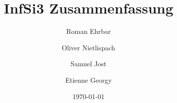 \documentclass[10pt,a4paper]{article}
\title{InfSi3 Zusammenfassung}
\author{
	Roman Ehrbar\\
	\and
	Oliver Nietlispach\\
	\and
	Samuel Jost\\
	\and
	Etienne Georgy
	}
\date{\today}
\begin{document}
\maketitle
\tableofcontents
\listoftodos
\newpage 






















\end{document}
